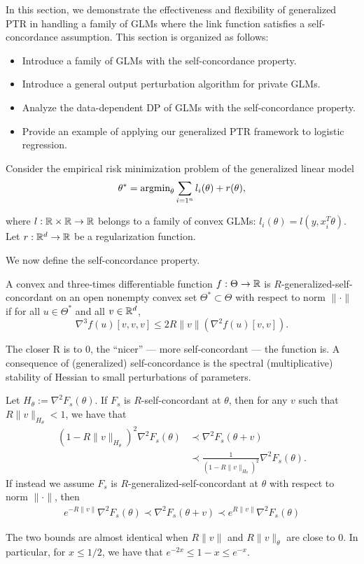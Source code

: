 In this section, we demonstrate the effectiveness and flexibility of generalized PTR in handling a family of GLMs where the link function satisfies a self-concordance assumption.  This section is organized as follows:
\begin{itemize}
    \item Introduce a family of GLMs with the self-concordance property.
    \item Introduce a general output perturbation algorithm for private GLMs.
    \item Analyze the data-dependent DP of GLMs with the self-concordance property.
    \item Provide an example of applying our generalized PTR framework to logistic regression.
\end{itemize}


Consider the empirical risk minimization problem of the generalized linear model
\[
\theta^* = \text{argmin}_\theta \sum_{i=1^n} l_i(\theta)+r(\theta),
\]

where  $l: \mathbb{R}\times \mathbb{R} \rightarrow \mathbb{R}$ belongs to a family of convex GLMs: $l_i (\theta) =  l(y, x_i^T\theta)$. Let $r: \mathbb{R}^d \rightarrow \mathbb{R}$ be a regularization function.

We now define the self-concordance property.
\begin{definition}
	A convex and three-times differentiable function $f: \Theta \rightarrow \mathbb{R}$ is $R$-generalized-self-concordant on an open nonempty convex set $\Theta^*\subset \Theta$ with respect to norm $\|\cdot\|$ if for all $u\in \Theta^*$ and all $v\in \mathbb{R}^d$,
	$$
	\nabla^3 f(u)  [v,v,v]  \leq 2 R\|v\|(\nabla^2 f(u)[v,v]).
	$$
\end{definition}

The closer R is to 0, the ``nicer'' --- more self-concordant --- the function is.  A consequence of (generalized) self-concordance is the spectral (multiplicative) stability of Hessian to small perturbations of parameters.

\begin{lemma}\label{lem:selfconcordant-hessian}
	Let $H_\theta :=  \nabla^2F_s(\theta)$. If $F_s$ is $R$-self-concordant at $\theta$, then for any $v$ such that $R \|v\|_{H_\theta} < 1$, we have that
	\begin{align*}
	(1-R\|v\|_{H_\theta})^2 \nabla^2 F_s(\theta) 	&\prec	\nabla^2 F_s(\theta+v) \\ &\prec  \frac{1}{(1-R\|v\|_{H_\theta})^2}   \nabla^2 F_s(\theta)  .
	\end{align*}
	If instead we assume $F_s$ is $R$-generalized-self-concordant at $\theta$ with respect to norm $\|\cdot\|$, then
\begin{align*}
	e^{-R\|v\|} \nabla^2 F_s(\theta) \prec  \nabla^2 F_s(\theta+v)  \prec e^{R\|v\|}  \nabla^2 F_s(\theta) 
	\end{align*}
\end{lemma}\label{stability}
The two bounds are almost identical when  $R\|v\|$ and $R\|v\|_{\theta}$ are close to $0$. In particular, for $x\leq 1/2$, we have that $e^{-2x} \leq 1-x \leq e^{-x}$.


